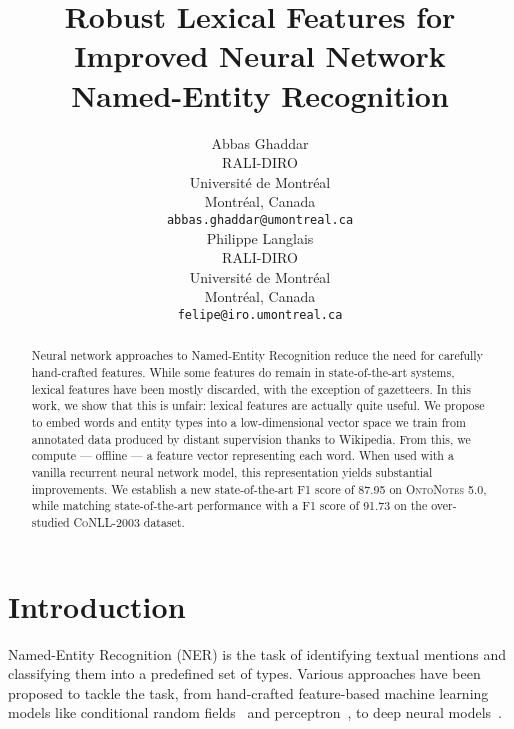 \documentclass[11pt]{article}
\title{Robust Lexical Features for Improved Neural Network\\Named-Entity Recognition}
\author{Abbas Ghaddar \\
	RALI-DIRO \\
	Universit\'e de Montr\'eal \\
	Montr\'eal, Canada \\
	{\tt abbas.ghaddar@umontreal.ca} \\\And
	Philippe Langlais \\
	RALI-DIRO \\
	Universit\'e de Montr\'eal \\
	Montr\'eal, Canada \\
	{\tt felipe@iro.umontreal.ca} \\}
\date{}
\newcommand{\conll}{\textsc{CoNLL}}
\newcommand{\onto}{\textsc{OntoNotes}}
\begin{document}
	\maketitle
	\begin{abstract}
		Neural network approaches to Named-Entity Recognition reduce the need for carefully hand-crafted features. While some features do remain in state-of-the-art systems, lexical features have been mostly discarded, with the exception of gazetteers. In this work, we show that this is unfair: lexical features are actually quite useful. We  propose to embed words and entity types into a low-dimensional vector space we train from annotated data produced by distant supervision thanks to Wikipedia. From this, we compute --- offline --- a feature vector representing each word. When used with a vanilla recurrent neural network model, this representation yields substantial improvements. We establish a new state-of-the-art  F1 score of 87.95 on  \onto{ 5.0}, while matching state-of-the-art performance with a F1 score of 91.73 on the over-studied \conll{-2003} dataset.

	\end{abstract}
	
	\section{Introduction}


	
	
	
	
	
	Named-Entity Recognition (NER) is the task of identifying textual mentions and classifying them into a predefined set of types.   Various approaches have been proposed to tackle the task, from hand-crafted feature-based machine learning models like conditional random fields~\cite{finkel2005incorporating} and perceptron~\cite{ratinov2009design}, to deep neural models~\cite{collobert2011natural,ma2016end,strubell2017fast}.
	
\end{document}
